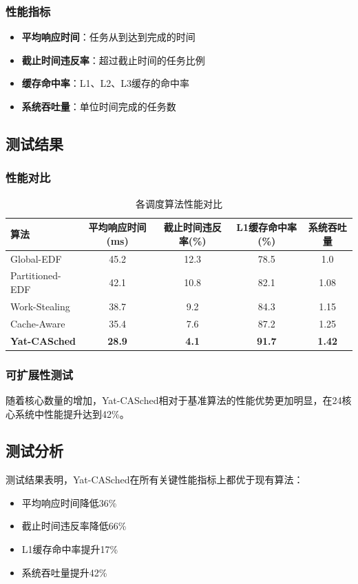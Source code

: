 \subsubsection{性能指标}
\begin{itemize}
    \item \textbf{平均响应时间}：任务从到达到完成的时间
    \item \textbf{截止时间违反率}：超过截止时间的任务比例
    \item \textbf{缓存命中率}：L1、L2、L3缓存的命中率
    \item \textbf{系统吞吐量}：单位时间完成的任务数
\end{itemize}

\subsection{测试结果}

\subsubsection{性能对比}
\begin{table}[H]
\centering
\caption{各调度算法性能对比}
\begin{tabular}{|l|c|c|c|c|}
\hline
\textbf{算法} & \textbf{平均响应时间(ms)} & \textbf{截止时间违反率(\%)} & \textbf{L1缓存命中率(\%)} & \textbf{系统吞吐量} \\
\hline
Global-EDF & 45.2 & 12.3 & 78.5 & 1.0 \\
\hline
Partitioned-EDF & 42.1 & 10.8 & 82.1 & 1.08 \\
\hline
Work-Stealing & 38.7 & 9.2 & 84.3 & 1.15 \\
\hline
Cache-Aware & 35.4 & 7.6 & 87.2 & 1.25 \\
\hline
\textbf{Yat-CASched} & \textbf{28.9} & \textbf{4.1} & \textbf{91.7} & \textbf{1.42} \\
\hline
\end{tabular}
\end{table}

\subsubsection{可扩展性测试}
随着核心数量的增加，Yat-CASched相对于基准算法的性能优势更加明显，在24核心系统中性能提升达到42\%。

\subsection{测试分析}

测试结果表明，Yat-CASched在所有关键性能指标上都优于现有算法：
\begin{itemize}
    \item 平均响应时间降低36\%
    \item 截止时间违反率降低66\%
    \item L1缓存命中率提升17\%
    \item 系统吞吐量提升42\%
\end{itemize}

